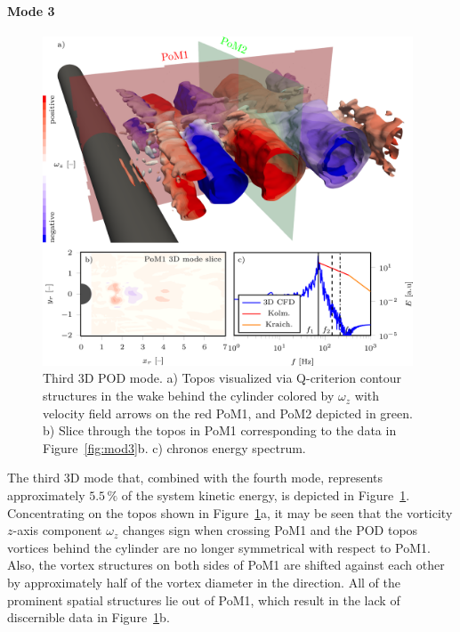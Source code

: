 {{\paragraph{Mode 3}
\begin{figure}[htbp]
    \centering
    \includegraphics[width=0.98\textwidth]{02_images/00_export/figure20.png}
    \caption{{Third 3D POD mode. a)} Topos {visualized via} Q-criterion contour structures in the wake behind the cylinder colored by $\omega_z$ with velocity field arrows on the red PoM1, and PoM2 depicted in green. {b) Slice through the topos in PoM1 corresponding to the data in Figure~\ref{fig:mod3}b. c) chronos energy spectrum.}}
    \label{fig:3Dmod3}
\end{figure}
The third 3D mode that, combined with the fourth mode, represents approximately $5.5\,\%$ of the system kinetic energy, is depicted in Figure~\ref{fig:3Dmod3}. {Concentrating on the topos shown in Figure~\ref{fig:3Dmod3}a, it may be seen that }{the vorticity $z$-axis component $\omega_{z}$ changes sign when crossing PoM1 and the} {POD topos} vortices behind the cylinder {are no longer symmetrical with respect to PoM1}. {Also, the vortex structures on both sides of PoM1 are shifted against each other by approximately half of the vortex diameter in the  direction. All of the prominent spatial structures lie out of PoM1, which result in the lack of discernible data in Figure~\ref{fig:3Dmod3}b.} 

}}

